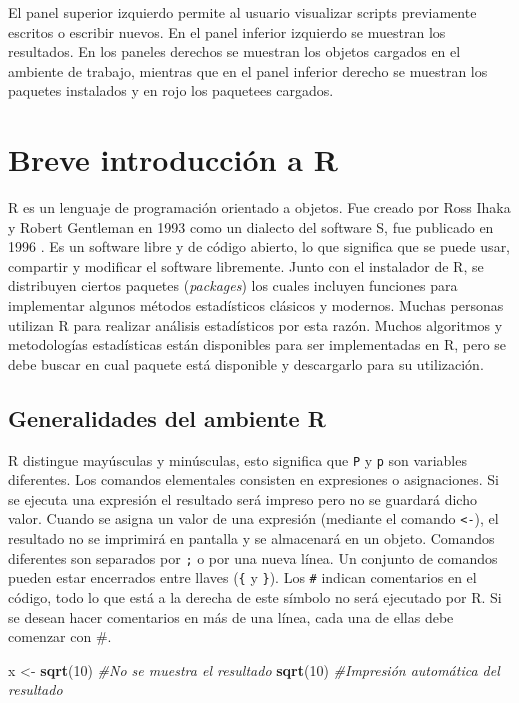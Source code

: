 \documentclass[]{book}
\newenvironment{Shaded}{\begin{snugshade}}{\end{snugshade}}
\newcommand{\KeywordTok}[1]{\textcolor[rgb]{0.13,0.29,0.53}{\textbf{#1}}}
\newcommand{\DecValTok}[1]{\textcolor[rgb]{0.00,0.00,0.81}{#1}}
\newcommand{\StringTok}[1]{\textcolor[rgb]{0.31,0.60,0.02}{#1}}
\newcommand{\CommentTok}[1]{\textcolor[rgb]{0.56,0.35,0.01}{\textit{#1}}}
\newcommand{\NormalTok}[1]{#1}
\begin{document}
El panel superior izquierdo permite al usuario visualizar scripts
previamente escritos o escribir nuevos. En el panel inferior izquierdo
se muestran los resultados. En los paneles derechos se muestran los
objetos cargados en el ambiente de trabajo, mientras que en el panel
inferior derecho se muestran los paquetes instalados y en rojo los
paquetees cargados.

\chapter{Breve introducción a R}\label{intro}

R \citep{R-base} es un lenguaje de programación orientado a objetos. Fue
creado por Ross Ihaka y Robert Gentleman en 1993 como un dialecto del
software S, fue publicado en 1996 \citep{ihaka1996r}. Es un software
libre y de código abierto, lo que significa que se puede usar, compartir
y modificar el software libremente. Junto con el instalador de R, se
distribuyen ciertos paquetes (\emph{packages}) los cuales incluyen
funciones para implementar algunos métodos estadísticos clásicos y
modernos. Muchas personas utilizan R para realizar análisis estadísticos
por esta razón. Muchos algoritmos y metodologías estadísticas están
disponibles para ser implementadas en R, pero se debe buscar en cual
paquete está disponible y descargarlo para su utilización.

\section{Generalidades del ambiente R}\label{SintaxisBasica}

R distingue mayúsculas y minúsculas, esto significa que \texttt{P} y
\texttt{p} son variables diferentes. Los comandos elementales consisten
en expresiones o asignaciones. Si se ejecuta una expresión el resultado
será impreso pero no se guardará dicho valor. Cuando se asigna un valor
de una expresión (mediante el comando \texttt{\textless{}-}), el
resultado no se imprimirá en pantalla y se almacenará en un objeto.
Comandos diferentes son separados por \texttt{;} o por una nueva línea.
Un conjunto de comandos pueden estar encerrados entre llaves
(\texttt{\{} y \texttt{\}}). Los \texttt{\#} indican comentarios en el
código, todo lo que está a la derecha de este símbolo no será ejecutado
por R. Si se desean hacer comentarios en más de una línea, cada una de
ellas debe comenzar con \#.

\begin{Shaded}
\begin{Highlighting}[]
\NormalTok{x <-}\StringTok{ }\KeywordTok{sqrt}\NormalTok{(}\DecValTok{10}\NormalTok{) }\CommentTok{#No se muestra el resultado}
\KeywordTok{sqrt}\NormalTok{(}\DecValTok{10}\NormalTok{)      }\CommentTok{#Impresión automática del resultado}
\end{Highlighting}
\end{Shaded}
\end{document}
